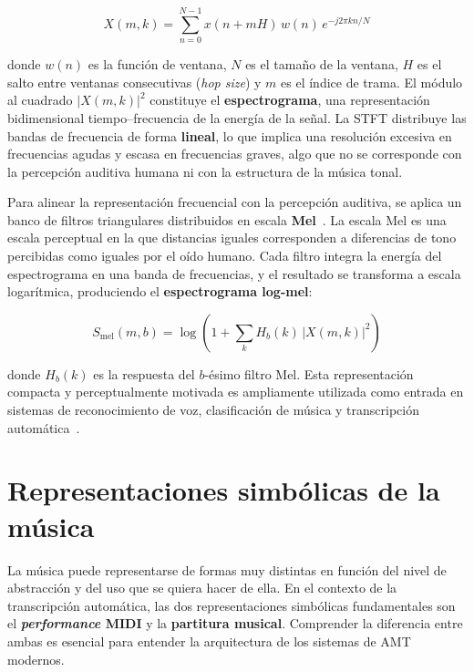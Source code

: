 \documentclass[11pt,spanish,listoffigures,listoftables]{tfgetsinf}
\begin{document}
\begin{equation}
    X(m, k) = \sum_{n=0}^{N-1} x(n + mH)\, w(n)\, e^{-j2\pi kn/N}
    \label{eqstft}
\end{equation}

\noindent donde $w(n)$ es la función de ventana, $N$ es el tamaño de la
ventana, $H$ es el salto entre ventanas consecutivas (\textit{hop size}) y
$m$ es el índice de trama. El módulo al cuadrado $|X(m,k)|^2$ constituye
el \textbf{espectrograma}, una representación bidimensional tiempo--frecuencia
de la energía de la señal. La STFT distribuye las bandas de frecuencia de
forma \textbf{lineal}, lo que implica una resolución excesiva en frecuencias
agudas y escasa en frecuencias graves, algo que no se corresponde con la
percepción auditiva humana ni con la estructura de la música tonal.


Para alinear la representación frecuencial con la percepción auditiva, se
aplica un banco de filtros triangulares distribuidos en escala
\textbf{Mel}~\cite{davis1980mel}. La escala Mel es una escala perceptual en
la que distancias iguales corresponden a diferencias de tono percibidas como
iguales por el oído humano. Cada filtro integra la energía del espectrograma
en una banda de frecuencias, y el resultado se transforma a escala logarítmica,
produciendo el \textbf{espectrograma log-mel}:

\begin{equation}
    S_{\text{mel}}(m, b) = \log\!\left(1 + \sum_{k} H_b(k)\,|X(m,k)|^2\right)
    \label{eqlogmel}
\end{equation}

\noindent donde $H_b(k)$ es la respuesta del $b$-ésimo filtro Mel. Esta
representación compacta y perceptualmente motivada es ampliamente utilizada
como entrada en sistemas de reconocimiento de voz, clasificación de música y
transcripción automática~\cite{davis1980mel}.

\section{Representaciones simbólicas de la música}
\label{secpreliminaresrepmusical}

La música puede representarse de formas muy distintas en función del nivel de
abstracción y del uso que se quiera hacer de ella. En el contexto de la
transcripción automática, las dos representaciones simbólicas fundamentales son
el \textbf{\textit{performance} MIDI} y la \textbf{partitura musical}. Comprender la
diferencia entre ambas es esencial para entender la arquitectura de los sistemas
de AMT modernos.
\end{document}
